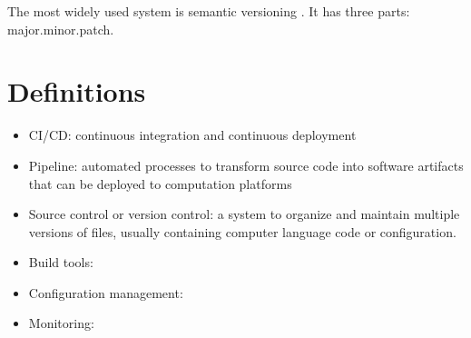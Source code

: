 \documentclass[12pt,dvipsnames]{article}
\begin{document}
The most widely used system is semantic versioning \cite{Wikipedia_software_version}.
It has three parts: major.minor.patch.



\section{Definitions}

\begin{itemize}
    \item CI/CD: continuous integration and continuous deployment 
    \item Pipeline: automated processes to transform source code 
    into software artifacts that can be deployed to computation platforms
    \item Source control or version control: a system to organize and maintain multiple versions of files, usually containing computer language code or configuration.    
    \item Build tools: 
    \item Configuration management:
    \item Monitoring: 
\end{itemize}



%


\end{document}
